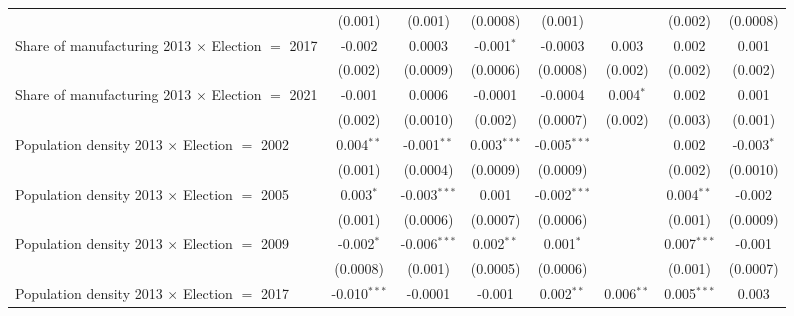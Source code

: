 \begin{table}[htbp]
\begin{tabular}{lccccccc}
                                                              & (0.001)        & (0.001)        & (0.0008)               & (0.001)        &                & (0.002)        & (0.0008)\\   
      Share of manufacturing 2013 $\times$ Election $=$ 2017  & -0.002         & 0.0003         & -0.001$^{*}$           & -0.0003        & 0.003          & 0.002          & 0.001\\   
                                                              & (0.002)        & (0.0009)       & (0.0006)               & (0.0008)       & (0.002)        & (0.002)        & (0.002)\\   
      Share of manufacturing 2013 $\times$ Election $=$ 2021  & -0.001         & 0.0006         & -0.0001                & -0.0004        & 0.004$^{*}$    & 0.002          & 0.001\\   
                                                              & (0.002)        & (0.0010)       & (0.002)                & (0.0007)       & (0.002)        & (0.003)        & (0.001)\\   
      Population density 2013 $\times$ Election $=$ 2002      & 0.004$^{**}$   & -0.001$^{**}$  & 0.003$^{***}$          & -0.005$^{***}$ &                & 0.002          & -0.003$^{*}$\\   
                                                              & (0.001)        & (0.0004)       & (0.0009)               & (0.0009)       &                & (0.002)        & (0.0010)\\   
      Population density 2013 $\times$ Election $=$ 2005      & 0.003$^{*}$    & -0.003$^{***}$ & 0.001                  & -0.002$^{***}$ &                & 0.004$^{**}$   & -0.002\\   
                                                              & (0.001)        & (0.0006)       & (0.0007)               & (0.0006)       &                & (0.001)        & (0.0009)\\   
      Population density 2013 $\times$ Election $=$ 2009      & -0.002$^{*}$   & -0.006$^{***}$ & 0.002$^{**}$           & 0.001$^{*}$    &                & 0.007$^{***}$  & -0.001\\   
                                                              & (0.0008)       & (0.001)        & (0.0005)               & (0.0006)       &                & (0.001)        & (0.0007)\\   
      Population density 2013 $\times$ Election $=$ 2017      & -0.010$^{***}$ & -0.0001        & -0.001                 & 0.002$^{**}$   & 0.006$^{**}$   & 0.005$^{***}$  & 0.003\\   

\end{tabular}
\end{table}
